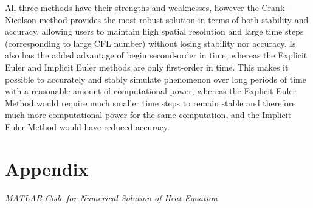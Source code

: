 \documentclass[10pt, letter, showtrims]{extarticle}
\begin{document}
		\noindent
		All three methods have their strengths and weaknesses, however the Crank-Nicolson method provides the most robust solution in terms of both stability and accuracy, allowing users to maintain high spatial resolution and large time steps (corresponding to large CFL number) without losing stability nor accuracy. Is also has the added advantage of begin second-order in time, whereas the Explicit Euler and Implicit Euler methods are only first-order in time. This makes it possible to accurately and stably simulate phenomenon over long periods of time with a reasonable amount of computational power, whereas the Explicit Euler Method would require much smaller time steps to remain stable and therefore much more computational power for the same computation, and the Implicit Euler Method would have reduced accuracy.
		\pagebreak	
	
	\section{Appendix}
	
	\centerline{\textit{MATLAB Code for Numerical Solution of Heat Equation}}
	
	
	
	\pagebreak
	
	
	
\end{document}
